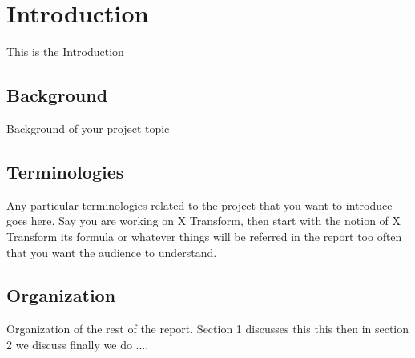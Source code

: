 \section{Introduction}

This is the Introduction 

\subsection{Background}
Background of your project topic

\subsection{Terminologies}

Any particular terminologies related to the project that you want to introduce goes here. Say you are working on X Transform, then start with the notion of X Transform its formula or whatever things will be referred in the report too often that you want the audience to understand.

\subsection{Organization}
Organization of the rest of the report. Section 1 discusses this this then in section 2 we discuss finally we do ....
